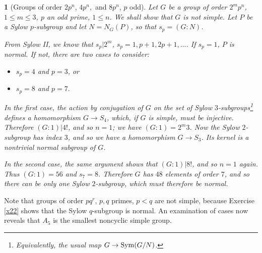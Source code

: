 \documentclass[a4paper,11pt,final]{memoir}%
\newtheorem{plain}[X]{}
\theoremstyle{nonumberplain}
\begin{document}
\begin{plain}
[Groups of order $2p^{n}$, $4p^{n},$ and $8p^{n}$, $p$ odd]\label{st20}%
%
Let $G$ be a group of order $2^{m}p^{n}$, $1\leq m\leq3$, $p$ an odd prime,
$1\leq n$. We shall show that $G$ is not simple. Let $P$ be a Sylow
$p$-subgroup and let $N=N_{G}(P)$, so that $s_{p}=(G:N)$.

From Sylow II, we know that $s_{p}|2^{m}$, $s_{p}=1,p+1,2p+1,\ldots$. If
$s_{p}=1$, $P$ is normal. If not, there are two cases to consider:

\begin{itemize}
\item[(i)] $s_{p}=4$ and $p=3$, or

\item[(ii)] $s_{p}=8$ and $p=7.$
\end{itemize}

In the first case, the action by conjugation of $G$ on the set of Sylow
$3$-subgroups\footnote{Equivalently, the usual map $G\rightarrow\operatorname{Sym}(G/N)$.}
defines a homomorphism $G\rightarrow S_{4}$, which, if $G$ is simple, must be
injective. Therefore $(G:1)|4!$, and so $n=1$; we have $(G:1)=2^{m}3$. Now the
Sylow $2$-subgroup has index $3$, and so we have a homomorphism $G\rightarrow
S_{3}$. Its kernel is a nontrivial normal subgroup of $G$.

In the second case, the same argument shows that $(G:1)|8!$, and so $n=1$
again. Thus $(G:1)=56$ and $s_{7}=8$. Therefore $G$ has $48$ elements of order
$7$, and so there can be only one Sylow $2$-subgroup, which must therefore be normal.
\end{plain}

Note that groups of order $pq^{r}$, $p,q$ primes, $p<q$ are not simple,
because Exercise \ref{x22} shows that the Sylow $q$-subgroup is normal. An
examination of cases now reveals that $A_{5}$ is the smallest noncyclic simple group.
\end{document}
